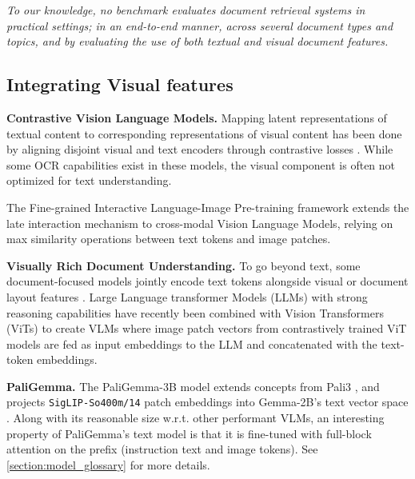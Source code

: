 \noindent\textit{To our knowledge, no benchmark evaluates document retrieval systems in practical settings; in an end-to-end manner, across several document types and topics, and by evaluating the use of both textual and visual document features.}



\subsection{Integrating Visual features}

\noindent\textbf{Contrastive Vision Language Models.}
Mapping latent representations of textual content to corresponding representations of visual content has been done by aligning disjoint visual and text encoders through contrastive losses . While some OCR capabilities exist in these models, the visual component is often not optimized for text understanding. 

The Fine-grained Interactive Language-Image Pre-training  framework extends the late interaction mechanism to cross-modal Vision Language Models, relying on max similarity operations between text tokens and image patches.


\noindent\textbf{Visually Rich Document Understanding.}
To go beyond text, some document-focused models jointly encode text tokens alongside visual or document layout features . 
Large Language transformer Models (LLMs) with strong reasoning capabilities have recently been combined with Vision Transformers (ViTs)  to create VLMs  where image patch vectors from contrastively trained ViT models  are fed as input embeddings to the LLM and concatenated with the text-token embeddings. 

\label{paragraph:generative_vision_language_model}
\noindent\textbf{PaliGemma.}
The PaliGemma-3B model  extends concepts from Pali3 , and projects \texttt{SigLIP-So400m/14}  patch embeddings into Gemma-2B's text vector space . Along with its reasonable size w.r.t. other performant VLMs, an interesting property of PaliGemma's text model is that it is fine-tuned with full-block attention on the prefix (instruction text and image tokens). See \autoref{section:model_glossary} for more details.

